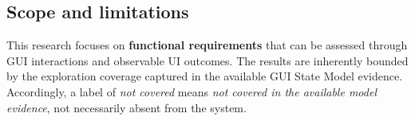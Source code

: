 \subsection{Scope and limitations}
\label{subsec:scope-limitations}

This research focuses on \textbf{functional requirements} that can be assessed through GUI interactions and observable UI outcomes. The results are inherently bounded by the exploration coverage captured in the available GUI State Model evidence. Accordingly, a label of \emph{not covered} means \emph{not covered in the available model evidence}, not necessarily absent from the system.
